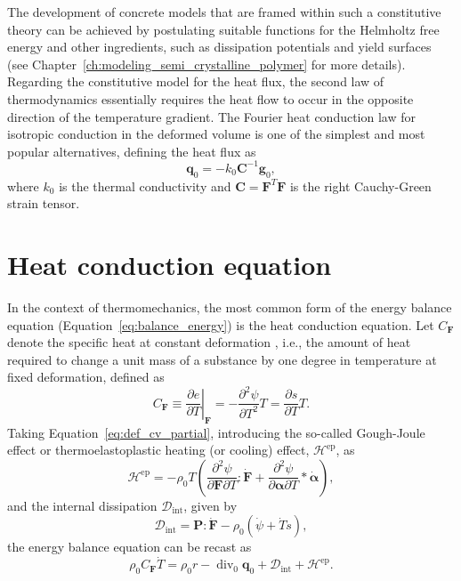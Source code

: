 The development of concrete models that are framed within such a constitutive theory can be achieved by postulating suitable functions for the  Helmholtz free energy and other ingredients, such as dissipation potentials and yield surfaces (see Chapter~\ref{ch:modeling_semi_crystalline_polymer} for more details).
Regarding the constitutive model for the heat flux, the second law of thermodynamics essentially requires the heat flow to occur in the opposite direction of the temperature gradient.
The Fourier heat conduction law for isotropic conduction in the deformed volume is one of the simplest and most popular alternatives, defining the heat flux as
\begin{equation}
  \bm{q}_0 = - k_0 \bm{C}^{-1} \bm{g}_0,
\end{equation}
where \(k_0\) is the thermal conductivity and \(\bm{C} = \bm{F}^T \bm{F}\) is the right Cauchy-Green strain tensor.


\section{Heat conduction equation}
\label{sec:heat-cond-equat}

In the context of thermomechanics, the most common form of the energy balance equation (Equation~\eqref{eq:balance_energy}) is the heat conduction equation.
Let \(C_{\bm F}\) denote the specific heat at constant deformation , i.e., the amount of heat required to change a unit mass of a substance by one degree in temperature at fixed deformation, defined as
\begin{equation} \label{eq:def_cv_partial}
  C_{\bm F}\equiv \left.\frac{\partial e}{\partial T}\right|_{\bm F}=-\frac{\partial^{2} \psi}{\partial T^{2}} T=\frac{\partial s}{\partial T} T.
\end{equation}
Taking Equation~\eqref{eq:def_cv_partial}, introducing the so-called Gough-Joule effect or thermoelastoplastic heating (or cooling) effect, \(\mathcal H^\text{ep}\), as
\begin{equation}
  \label{eq:def_gough_joule_effect}
  \mathcal H^\text{ep} = - \rho_0T\left(\frac{\partial^2 \psi}{\partial \bm{F}\partial T}: \dot{\bm{F}} + \frac{\partial^2 \psi}{\partial \bm{\alpha} \partial T}*\dot{\bm{\alpha}} \right),
\end{equation}
and the internal dissipation \(\mathcal D_\text{int}\), given by
\begin{equation}
  \mathcal D_\text{int} = \bm{P}:\dot{\bm{F}} - \rho_0(\dot \psi + \dot T s),
\end{equation}
the energy balance equation can be recast as
\begin{equation}
  \label{eq:heat_conduction}
  \rho_0 C_{\bm F} \dot T = \rho_0 r - \operatorname{div}_0 \bm{q}_0 + \mathcal D_\text{int} + \mathcal H^\text{ep}.
\end{equation}

